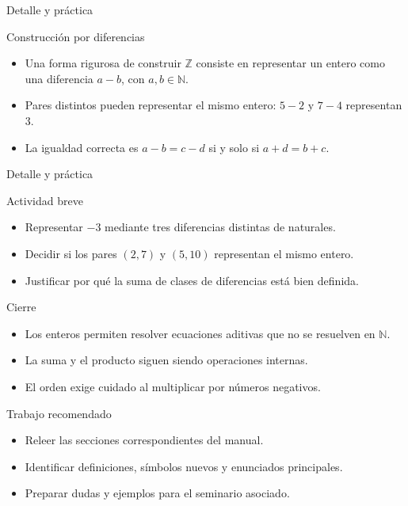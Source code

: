 \documentclass[aspectratio=169,11pt]{beamer}
\begin{document}
\begin{frame}{Detalle y práctica}
\begin{block}{Construcción por diferencias}
\begin{itemize}
  \item Una forma rigurosa de construir \(\mathbb{Z}\) consiste en representar un entero como una diferencia \(a-b\), con \(a,b\in\mathbb{N}\).
  \item Pares distintos pueden representar el mismo entero: \(5-2\) y \(7-4\) representan \(3\).
  \item La igualdad correcta es \(a-b=c-d\) si y solo si \(a+d=b+c\).
\end{itemize}
\end{block}
\end{frame}

\begin{frame}{Detalle y práctica}
\begin{block}{Actividad breve}
\begin{itemize}
  \item Representar \(-3\) mediante tres diferencias distintas de naturales.
  \item Decidir si los pares \((2,7)\) y \((5,10)\) representan el mismo entero.
  \item Justificar por qué la suma de clases de diferencias está bien definida.
\end{itemize}
\end{block}
\end{frame}

\begin{frame}{Cierre}
\begin{itemize}
  \item Los enteros permiten resolver ecuaciones aditivas que no se resuelven en \(\mathbb{N}\).
  \item La suma y el producto siguen siendo operaciones internas.
  \item El orden exige cuidado al multiplicar por números negativos.
\end{itemize}
\end{frame}

\begin{frame}{Trabajo recomendado}
\begin{itemize}
  \item Releer las secciones correspondientes del manual.
  \item Identificar definiciones, símbolos nuevos y enunciados principales.
  \item Preparar dudas y ejemplos para el seminario asociado.
\end{itemize}
\end{frame}
\end{document}
